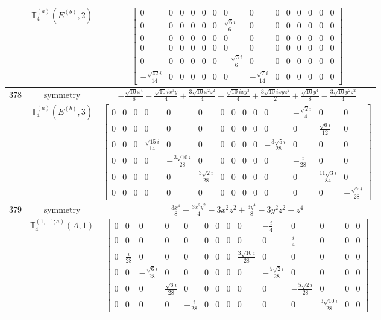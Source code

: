 \documentclass[fleqn,8pt,landscape]{jsarticle}
\begin{document}
\begin{longtable}{ccc}
$  $ & $ \mathbb{T}_{4}^{(a)}(E^{(b)},2) $ & $ \begin{bmatrix} 0 & 0 & 0 & 0 & 0 & 0 & 0 & 0 & 0 & 0 & 0 & 0 & 0 & 0 \\ 0 & 0 & 0 & 0 & 0 & 0 & \frac{\sqrt{6} i}{6} & 0 & 0 & 0 & 0 & 0 & 0 & 0 \\ 0 & 0 & 0 & 0 & 0 & 0 & 0 & 0 & 0 & 0 & 0 & 0 & 0 & 0 \\ 0 & 0 & 0 & 0 & 0 & 0 & 0 & 0 & 0 & 0 & 0 & 0 & 0 & 0 \\ 0 & 0 & 0 & 0 & 0 & 0 & - \frac{\sqrt{3} i}{6} & 0 & 0 & 0 & 0 & 0 & 0 & 0 \\ - \frac{\sqrt{42} i}{14} & 0 & 0 & 0 & 0 & 0 & 0 & - \frac{\sqrt{7} i}{14} & 0 & 0 & 0 & 0 & 0 & 0 \end{bmatrix} $ \\ \hline
$ 378 $ & $ \text{symmetry} $ & $ - \frac{\sqrt{10} x^{4}}{8} - \frac{\sqrt{10} i x^{3} y}{4} + \frac{3 \sqrt{10} x^{2} z^{2}}{4} - \frac{\sqrt{10} i x y^{3}}{4} + \frac{3 \sqrt{10} i x y z^{2}}{2} + \frac{\sqrt{10} y^{4}}{8} - \frac{3 \sqrt{10} y^{2} z^{2}}{4} $ \\
$  $ & $ \mathbb{T}_{4}^{(a)}(E^{(b)},3) $ & $ \begin{bmatrix} 0 & 0 & 0 & 0 & 0 & 0 & 0 & 0 & 0 & 0 & 0 & - \frac{\sqrt{2} i}{4} & 0 & 0 \\ 0 & 0 & 0 & 0 & 0 & 0 & 0 & 0 & 0 & 0 & 0 & 0 & \frac{\sqrt{6} i}{12} & 0 \\ 0 & 0 & 0 & \frac{\sqrt{15} i}{14} & 0 & 0 & 0 & 0 & 0 & 0 & - \frac{3 \sqrt{5} i}{28} & 0 & 0 & 0 \\ 0 & 0 & 0 & 0 & - \frac{3 \sqrt{10} i}{28} & 0 & 0 & 0 & 0 & 0 & 0 & - \frac{i}{28} & 0 & 0 \\ 0 & 0 & 0 & 0 & 0 & \frac{3 \sqrt{2} i}{28} & 0 & 0 & 0 & 0 & 0 & 0 & \frac{11 \sqrt{3} i}{84} & 0 \\ 0 & 0 & 0 & 0 & 0 & 0 & 0 & 0 & 0 & 0 & 0 & 0 & 0 & - \frac{\sqrt{7} i}{28} \end{bmatrix} $ \\ \hline
$ 379 $ & $ \text{symmetry} $ & $ \frac{3 x^{4}}{8} + \frac{3 x^{2} y^{2}}{4} - 3 x^{2} z^{2} + \frac{3 y^{4}}{8} - 3 y^{2} z^{2} + z^{4} $ \\
$  $ & $ \mathbb{T}_{4}^{(1,-1;a)}(A,1) $ & $ \begin{bmatrix} 0 & 0 & 0 & 0 & 0 & 0 & 0 & 0 & 0 & - \frac{i}{4} & 0 & 0 & 0 & 0 \\ 0 & 0 & 0 & 0 & 0 & 0 & 0 & 0 & 0 & 0 & \frac{i}{4} & 0 & 0 & 0 \\ 0 & \frac{i}{28} & 0 & 0 & 0 & 0 & 0 & 0 & \frac{3 \sqrt{10} i}{28} & 0 & 0 & 0 & 0 & 0 \\ 0 & 0 & - \frac{\sqrt{6} i}{28} & 0 & 0 & 0 & 0 & 0 & 0 & - \frac{5 \sqrt{2} i}{28} & 0 & 0 & 0 & 0 \\ 0 & 0 & 0 & \frac{\sqrt{6} i}{28} & 0 & 0 & 0 & 0 & 0 & 0 & - \frac{5 \sqrt{2} i}{28} & 0 & 0 & 0 \\ 0 & 0 & 0 & 0 & - \frac{i}{28} & 0 & 0 & 0 & 0 & 0 & 0 & \frac{3 \sqrt{10} i}{28} & 0 & 0 \end{bmatrix} $ \\ \hline

\end{longtable}
\end{document}
